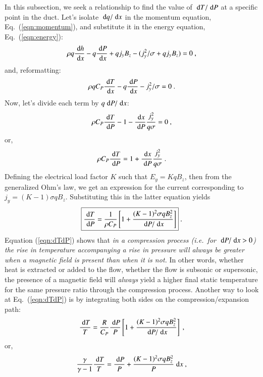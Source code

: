 \documentclass[oneside,10pt,onecolumn]{waflreport}
\newcommand{\Cp}{{C_{P}}}
\newcommand{\ie}{{\it i.e.}}
\newcommand\frameeqn[1]{\fbox{$\displaystyle #1$}}
\newcommand{\ordi}{\; {\rm d}}
\begin{document}
In this subsection, we seek a relationship to find the value of $\ordi T / \ordi P$
at a specific point in the duct. Let's isolate $\ordi q / \ordi x$ in the momentum
equation, Eq.\ (\ref{eqn:momentum}), and substitute it in the energy equation, Eq.\ (\ref{eqn:energy}):
%
\begin{equation}
\rho q \frac{\ordi h}{\ordi x}
- q \frac{\ordi P}{\ordi x} + q j_y B_z
- (j_y^2/\sigma + q j_y B_z)=0~,
\end{equation}
%
and, reformatting:
%
\begin{equation}
\rho q \Cp \frac{\ordi T}{\ordi x}
- q \frac{\ordi P}{\ordi x}
- j_y^2/\sigma=0~.
\end{equation}
%
Now, let's divide each term by $q \ordi P / \ordi x$:
%
\begin{equation}
\rho \Cp \frac{\ordi T}{\ordi P}
- 1
- \frac{\ordi x }{\ordi P} \frac{j_y^2}{q\sigma}=0~,
\end{equation}
%
or,
%
\begin{equation}
\rho \Cp \frac{\ordi T}{\ordi P}
= 1
+ \frac{\ordi x }{\ordi P} \frac{j_y^2}{q\sigma}~.
\end{equation}
%
Defining the electrical load factor $K$ such that $E_y=K q B_z$, then from the generalized Ohm's
law, we get an expression for the current corresponding to $j_y=(K-1)\sigma q B_z$. Substituting
this in the latter equation yields
%
\begin{equation}
\frameeqn{
\frac{\ordi T}{\ordi P}
= \frac{1}{\rho \Cp} \left[
1
+ \frac{(K-1)^2 \sigma q B_z^2}{\ordi P / \ordi x}
\right]}~.
\label{eqn:dTdP}
\end{equation}
%
Equation (\ref{eqn:dTdP}) shows that \emph{in a compression process (\ie\ for $\ordi P / \ordi x > 0$)
the rise in temperature accompanying a rise in pressure will always be greater when
a magnetic field is present than when it is not.} In other words, whether heat is extracted or
added to the flow, whether the flow is subsonic or supersonic, the presence of a magnetic field
will \emph{always} yield a higher final static temperature for the same pressure ratio through
the compression process. Another way to look at Eq.\ (\ref{eqn:dTdP}) is by integrating both
sides on the compression/expansion path:
%
\begin{equation}
\frac{\ordi T}{T}
= \frac{R}{\Cp} \frac{\ordi P}{P}
\left[ 1 + \frac{(K-1)^2 \sigma q B_z^2}{\ordi P / \ordi x}
\right]~,
\end{equation}
%
%
or,
%
\begin{equation}
\frac{\gamma}{\gamma-1}\frac{\ordi T}{T}
=  \frac{\ordi P}{P}
+ \frac{(K-1)^2 \sigma q B_z^2}{P} \ordi x~,
\end{equation}
\end{document}

